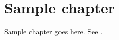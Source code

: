 \chapter{Sample chapter}
\label{chap:sample}

Sample chapter goes here. See \cite{turing2009computing}.